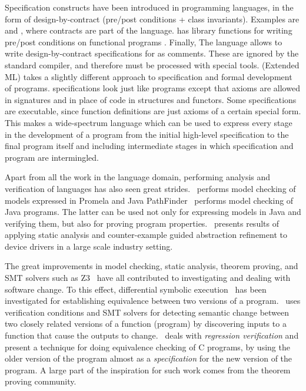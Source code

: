 Specification constructs have been introduced in programming
languages, in the form of design-by-contract (pre/post conditions +
class invariants). Examples are \eiffel{} \cite{eiffel} and
\specsharp{} \cite{specsharp}, where contracts are part of the
language. \scala{} has library functions for writing pre/post
conditions on functional programs \cite{odersky-rv10}. Finally, The
\jml{} language \cite{jml} allows to write design-by-contract
specifications for \java{} as comments. These are ignored by the
standard \java{} compiler, and therefore must be processed with
special tools. \eml{} (Extended ML) \cite{sannella-eml-97} takes a
slightly different approach to specification and formal development of
\sml{} programs.  \eml{} specifications look just like \sml{} programs
except that axioms are allowed in signatures and in place of code in
structures and functors. Some \eml{} specifications are executable,
since \sml{} function definitions are just axioms of a certain special
form. This makes \eml{} a wide-spectrum language which can be used to
express every stage in the development of a \sml{} program from the
initial high-level specification to the final program itself and
including intermediate stages in which specification and program are
intermingled.

Apart from all the work in the language domain, performing analysis
and verification of languages has also seen great
strides.~\cite{holzmann-spin-2004} performs model checking of models
expressed in Promela and Java
PathFinder~\cite{havelund-jpf-00,havelund-visser02} performs model
checking of Java programs. The latter can be used not only for
expressing models in Java and verifying them, but also for proving
program properties.~\cite{ball2010slam2} presents results of applying
static analysis and counter-example guided abstraction refinement to
device drivers in a large scale industry setting. 

The great improvements in model checking, static analysis, theorem
proving, and SMT solvers such as Z3~\cite{de2008z3} have all
contributed to investigating and dealing with software change. To this
effect, differential symbolic execution~\cite{person2008differential}
has been investigated for establishing equivalence between two
versions of a program.~\cite{lahiri2012symdiff} uses verification
conditions and SMT solvers for detecting semantic change between two
closely related versions of a function (program) by discovering inputs
to a function that cause the outputs to
change.~\cite{godlin2009regression} deals with \emph{regression
  verification} and present a technique for doing equivalence checking
of C programs, by using the older version of the program almost as a
\emph{specification} for the new version of the program. A large part
of the inspiration for such work comes from the theorem proving
community.
